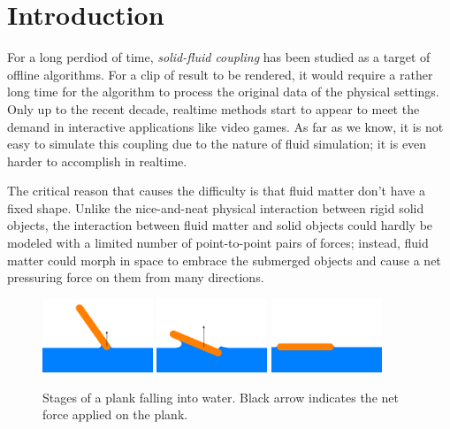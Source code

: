 \section{Introduction}

For a long perdiod of time, \emph{solid-fluid coupling} has been studied as a target of offline algorithms.
For a clip of result to be rendered, it would require a rather long time for the algorithm to process the original data of the physical settings.
Only up to the recent decade, realtime methods start to appear to meet the demand in interactive applications like video games.
As far as we know, it is not easy to simulate this coupling due to the nature of fluid simulation;
it is even harder to accomplish in realtime.

The critical reason that causes the difficulty is that fluid matter don't have a fixed shape.
Unlike the nice-and-neat physical interaction between rigid solid objects, the interaction between fluid matter and solid objects could hardly be modeled with a limited number of point-to-point pairs of forces;
instead, fluid matter could morph in space to embrace the submerged objects and cause a net pressuring force on them from many directions.

\begin{figure}[h]
	\begin{center}
		\includegraphics[width=1.3in]{figures/stages-of-a-plank-falling-into-water/1.png}
		\includegraphics[width=1.3in]{figures/stages-of-a-plank-falling-into-water/2.png}
		\includegraphics[width=1.3in]{figures/stages-of-a-plank-falling-into-water/3.png}
	\end{center}
	\caption{
		Stages of a plank falling into water.
		Black arrow indicates the net force applied on the plank.
	}
	\label{stages-of-a-plank-falling-into-water}
\end{figure}

